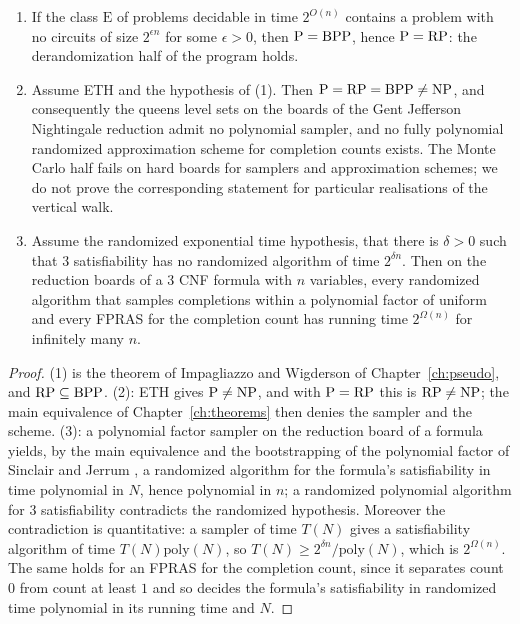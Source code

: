 \begin{theorem}
\label{thm:ethprogram}
\begin{enumerate}
\item If the class $\mathrm E$ of problems decidable in time $2^{O(n)}$ contains a problem with no circuits of size $2^{\epsilon n}$ for some $\epsilon > 0$, then $\mathrm{P} = \mathrm{BPP}$, hence $\mathrm{P} = \mathrm{RP}$: the derandomization half of the program holds.
\item Assume ETH and the hypothesis of (1). Then $\mathrm{P} = \mathrm{RP} = \mathrm{BPP} \ne \mathrm{NP}$, and consequently the queens level sets on the boards of the Gent Jefferson Nightingale reduction admit no polynomial sampler, and no fully polynomial randomized approximation scheme for completion counts exists. The Monte Carlo half fails on hard boards for samplers and approximation schemes; we do not prove the corresponding statement for particular realisations of the vertical walk.
\item Assume the randomized exponential time hypothesis, that there is $\delta > 0$ such that $3$ satisfiability has no randomized algorithm of time $2^{\delta n}$. Then on the reduction boards of a $3$ CNF formula with $n$ variables, every randomized algorithm that samples completions within a polynomial factor of uniform and every FPRAS for the completion count has running time $2^{\Omega(n)}$ for infinitely many $n$.
\end{enumerate}
\end{theorem}

\begin{proof}
(1) is the theorem of Impagliazzo and Wigderson of Chapter~\ref{ch:pseudo}, and $\mathrm{RP} \subseteq \mathrm{BPP}$. (2): ETH gives $\mathrm{P} \ne \mathrm{NP}$, and with $\mathrm{P} = \mathrm{RP}$ this is $\mathrm{RP} \ne \mathrm{NP}$; the main equivalence of Chapter~\ref{ch:theorems} then denies the sampler and the scheme. (3): a polynomial factor sampler on the reduction board of a formula yields, by the main equivalence and the bootstrapping of the polynomial factor of Sinclair and Jerrum \cite{SinclairJerrum}, a randomized algorithm for the formula's satisfiability in time polynomial in $N$, hence polynomial in $n$; a randomized polynomial algorithm for $3$ satisfiability contradicts the randomized hypothesis. Moreover the contradiction is quantitative: a sampler of time $T(N)$ gives a satisfiability algorithm of time $T(N) \mathrm{poly}(N)$, so $T(N) \ge 2^{\delta n} / \mathrm{poly}(N)$, which is $2^{\Omega(n)}$. The same holds for an FPRAS for the completion count, since it separates count $0$ from count at least $1$ and so decides the formula's satisfiability in randomized time polynomial in its running time and $N$.
\end{proof}

